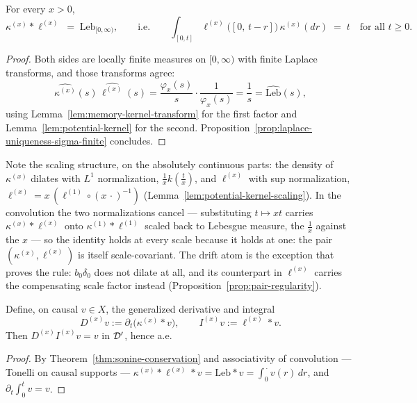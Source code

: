 \begin{theorem}\label{thm:sonine-conservation}
For every $x > 0$,
\[
  \kappa^{(x)} * \ell^{(x)} \;=\; \mathrm{Leb}_{[0,\infty)},
  \qquad \text{i.e.} \qquad
  \int_{[0,t]} \ell^{(x)}\bigl([0,\, t - r]\bigr)\,\kappa^{(x)}(dr) \;=\; t
  \quad \text{for all } t \ge 0.
\]
\end{theorem}

\begin{proof}
Both sides are locally finite measures on $[0,\infty)$ with finite Laplace transforms, and
those transforms agree:
\[
  \widehat{\kappa^{(x)}}(s)\,\widehat{\ell^{(x)}}(s)
  = \frac{\varphi_x(s)}{s}\cdot\frac{1}{\varphi_x(s)} = \frac{1}{s}
  = \widehat{\mathrm{Leb}}(s),
\]
using Lemma~\ref{lem:memory-kernel-transform} for the first factor and
Lemma~\ref{lem:potential-kernel} for the second.
Proposition~\ref{prop:laplace-uniqueness-sigma-finite} concludes.
\end{proof}

Note the scaling structure, on the absolutely continuous parts: the density of
$\kappa^{(x)}$ dilates with $L^1$ normalization, $\tfrac1x k(\tfrac tx)$, and $\ell^{(x)}$
with sup normalization, $\ell^{(x)} = x\,(\ell^{(1)} \circ (x\,\cdot)^{-1})$
(Lemma~\ref{lem:potential-kernel-scaling}). In the convolution the two normalizations cancel
--- substituting $t \mapsto xt$ carries $\kappa^{(x)} * \ell^{(x)}$ onto
$\kappa^{(1)} * \ell^{(1)}$ scaled back to Lebesgue measure, the $\tfrac1x$ against the $x$
--- so the identity holds at every scale because it holds at one: the pair
$(\kappa^{(x)}, \ell^{(x)})$ is itself scale-covariant. The drift atom is the exception that
proves the rule: $b_0\delta_0$ does not dilate at all, and its counterpart in $\ell^{(x)}$
carries the compensating scale factor instead (Proposition~\ref{prop:pair-regularity}).

\begin{corollary}\label{cor:exact-inversion}
Define, on causal $v \in X$, the generalized derivative and integral
\[
  D^{(x)} v := \partial_t\bigl(\kappa^{(x)} * v\bigr), \qquad I^{(x)} v := \ell^{(x)} * v .
\]
Then $D^{(x)} I^{(x)} v = v$ in $\mathcal{D}'$, hence a.e.
\end{corollary}

\begin{proof}
By Theorem~\ref{thm:sonine-conservation} and associativity of convolution --- Tonelli on
causal supports --- $\kappa^{(x)} * \ell^{(x)} * v = \mathrm{Leb} * v = \int_0^{\,\cdot} v(r)\,dr$,
and $\partial_t \int_0^t v = v$.
\end{proof}

